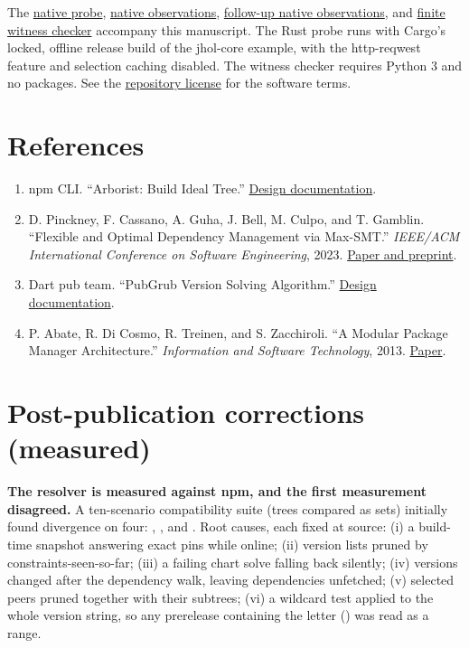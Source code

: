 \documentclass[
  11pt,
  letterpaper,
]{article}
\providecommand{\tightlist}{%
  \setlength{\itemsep}{0pt}\setlength{\parskip}{0pt}}
\begin{document}
The \href{../../crates/jhol-core/examples/jagr_paper_iv_probe.rs}{native
probe},
\href{../architecture/experiments/jagr-infinite-native-probe-2026-11-13.json}{native
observations},
\href{../architecture/experiments/jagr-infinite-native-probe-release-edges-2026-11-13.json}{follow-up
native observations}, and
\href{../../scripts/bench/jagr_iv_witness.py}{finite witness checker}
accompany this manuscript. The Rust probe runs with Cargo's locked,
offline release build of the jhol-core example, with the http-reqwest
feature and selection caching disabled. The witness checker requires
Python 3 and no packages. See the \href{../../LICENSE}{repository
license} for the software terms.

\section*{References}\label{references}

\begin{enumerate}
\def\labelenumi{\arabic{enumi}.}
\tightlist
\item
  npm CLI. ``Arborist: Build Ideal Tree.''
  \href{https://github.com/npm/cli/blob/latest/workspaces/arborist/docs/ideal-tree.md}{Design
  documentation}.
\item
  D. Pinckney, F. Cassano, A. Guha, J. Bell, M. Culpo, and T. Gamblin.
  ``Flexible and Optimal Dependency Management via Max-SMT.''
  \emph{IEEE/ACM International Conference on Software Engineering},
  2023. \href{https://arxiv.org/abs/2203.13737}{Paper and preprint}.
\item
  Dart pub team. ``PubGrub Version Solving Algorithm.''
  \href{https://dart.googlesource.com/pub.git/+/f27dcfdb/doc/solver.md}{Design
  documentation}.
\item
  P. Abate, R. Di Cosmo, R. Treinen, and S. Zacchiroli. ``A Modular
  Package Manager Architecture.'' \emph{Information and Software
  Technology}, 2013.
  \href{https://www.dicosmo.org/Articles/2013-AbateDiCosmoTreinenZacchiroli-Ist.pdf}{Paper}.
\end{enumerate}


\section*{Post-publication corrections (measured)}

\textbf{The resolver is measured against npm, and the first measurement disagreed.} A ten-scenario
compatibility suite (trees compared as  sets) initially found divergence on four:
, ,  and . Root causes, each fixed at source:
(i) a build-time snapshot answering exact pins while online; (ii) version lists pruned by
constraints-seen-so-far; (iii) a failing chart solve falling back silently; (iv) versions changed
after the dependency walk, leaving dependencies unfetched; (v) selected peers pruned together with
their subtrees; (vi) a wildcard test applied to the whole version string, so any prerelease
containing the letter  () was read as a range.
\end{document}
